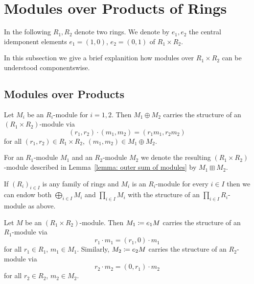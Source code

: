 \section{Modules over Products of Rings}
\label{appendix: modules over products of rings}


\begin{conventions}
  In the following $R_1, R_2$ denote two rings.
  We denote by $e_1, e_2$ the central idemponent elements $e_1 = (1,0)$, $e_2 = (0,1)$ of $R_1 \times R_2$.
\end{conventions}


\begin{fluff}
  In this subsection we give a brief explanition how modules over $R_1 \times R_2$ can be understood componentswise.
\end{fluff}





\subsection{Modules over Products}


\begin{lemma}
  \label{lemma: outer sum of modules}
  Let $M_i$ be an $R_i$-module for $i = 1, 2$.
  Then $M_1 \oplus M_2$ carries the structure of an $(R_1 \times R_2)$-module via
  \[
      (r_1, r_2) \cdot (m_1, m_2)
    = (r_1 m_1, r_2 m_2)
  \]
  for all $(r_1, r_2) \in R_1 \times R_2$, $(m_1, m_2) \in M_1 \oplus M_2$.
\end{lemma}




\begin{definition}
  For an $R_1$-module $M_1$ and an $R_2$-module $M_2$ we denote the resulting $(R_1 \times R_2)$-module described in Lemma~\ref{lemma: outer sum of modules} by $M_1 \boxplus M_2$.
\end{definition}


\begin{remark}
  If $(R_i)_{i \in I}$ is any family of rings and $M_i$ is an $R_i$-module for every $i \in I$ then we can endow both $\bigoplus_{i \in I} M_i$ and $\prod_{i \in I} M_i$ with the structure of an $\prod_{i \in I} R_i$-module as above.
\end{remark}


\begin{lemma}
  \label{lemma: restriction of modules}
  Let $M$ be an $(R_1 \times R_2)$-module.
  Then $M_1 \coloneqq e_1 M$ carries the structure of an $R_1$-module via
  \[
      r_1 \cdot m_1
    = (r_1, 0) \cdot m_1
  \]
  for all $r_1 \in R_1$, $m_1 \in M_1$.
  Similarly, $M_2 \coloneqq e_2 M$ carries the structure of an $R_2$-module via
  \[
      r_2 \cdot m_2
    = (0, r_1) \cdot m_2
  \]
  for all $r_2 \in R_2$, $m_2 \in M_2$.
\end{lemma}


